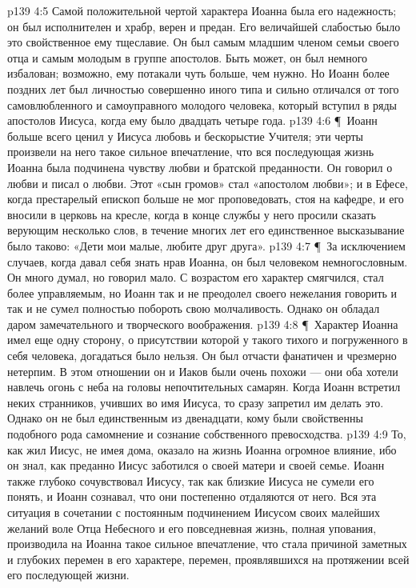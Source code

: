 \vs p139 4:5 Самой положительной чертой характера Иоанна была его надежность; он был исполнителен и храбр, верен и предан. Его величайшей слабостью было это свойственное ему тщеславие. Он был самым младшим членом семьи своего отца и самым молодым в группе апостолов. Быть может, он был немного избалован; возможно, ему потакали чуть больше, чем нужно. Но Иоанн более поздних лет был личностью совершенно иного типа и сильно отличался от того самовлюбленного и самоуправного молодого человека, который вступил в ряды апостолов Иисуса, когда ему было двадцать четыре года.
\vs p139 4:6 \P\ Иоанн больше всего ценил у Иисуса любовь и бескорыстие Учителя; эти черты произвели на него такое сильное впечатление, что вся последующая жизнь Иоанна была подчинена чувству любви и братской преданности. Он говорил о любви и писал о любви. Этот «сын громов» стал «апостолом любви»; и в Ефесе, когда престарелый епископ больше не мог проповедовать, стоя на кафедре, и его вносили в церковь на кресле, когда в конце службы у него просили сказать верующим несколько слов, в течение многих лет его единственное высказывание было таково: «Дети мои малые, любите друг друга».
\vs p139 4:7 \P\ За исключением случаев, когда давал себя знать нрав Иоанна, он был человеком немногословным. Он много думал, но говорил мало. С возрастом его характер смягчился, стал более управляемым, но Иоанн так и не преодолел своего нежелания говорить и так и не сумел полностью побороть свою молчаливость. Однако он обладал даром замечательного и творческого воображения.
\vs p139 4:8 \P\ Характер Иоанна имел еще одну сторону, о присутствии которой у такого тихого и погруженного в себя человека, догадаться было нельзя. Он был отчасти фанатичен и чрезмерно нетерпим. В этом отношении он и Иаков были очень похожи --- они оба хотели навлечь огонь с неба на головы непочтительных самарян. Когда Иоанн встретил неких странников, учивших во имя Иисуса, то сразу запретил им делать это. Однако он не был единственным из двенадцати, кому были свойственны подобного рода самомнение и сознание собственного превосходства.
\vs p139 4:9 То, как жил Иисус, не имея дома, оказало на жизнь Иоанна огромное влияние, ибо он знал, как преданно Иисус заботился о своей матери и своей семье. Иоанн также глубоко сочувствовал Иисусу, так как близкие Иисуса не сумели его понять, и Иоанн сознавал, что они постепенно отдаляются от него. Вся эта ситуация в сочетании с постоянным подчинением Иисусом своих малейших желаний воле Отца Небесного и его повседневная жизнь, полная упования, производила на Иоанна такое сильное впечатление, что стала причиной заметных и глубоких перемен в его характере, перемен, проявлявшихся на протяжении всей его последующей жизни.
